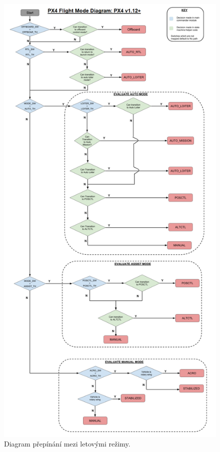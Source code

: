 \begin{figure}[!ht]
    \begin{center}
        \includegraphics[scale=0.4]{obrazky/fmode}
    \end{center}
    \caption[Diagram přepínání mezi letovými režimy]{Diagram přepínání mezi letovými režimy. \cite{PX4docs}}
    \label{fig:LETREZ}
\end{figure}


